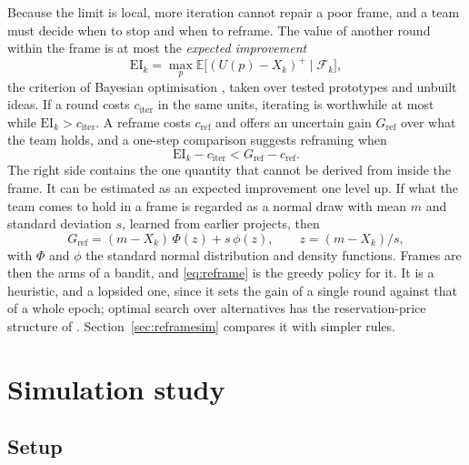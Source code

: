 \documentclass[preprint,review,11pt,authoryear]{elsarticle}
\newcommand{\E}{\mathbb{E}}
\newcommand{\filt}{\mathcal{F}}
\theoremstyle{definition}
\begin{document}
Because the limit is local, more iteration cannot repair a poor frame, and a team must decide when to stop and when to reframe. The value of another round within the frame is at most the \emph{expected improvement}
\begin{equation}
\label{eq:ei}
\mathrm{EI}_k=\max_p\E\big[(U(p)-X_k)^+\mid\filt_k\big],
\end{equation}
the criterion of Bayesian optimisation \citep{jones1998, frazier2008}, taken over tested prototypes and unbuilt ideas. If a round costs $c_{\mathrm{iter}}$ in the same units, iterating is worthwhile at most while $\mathrm{EI}_k>c_{\mathrm{iter}}$. A reframe costs $c_{\mathrm{ref}}$ and offers an uncertain gain $G_{\mathrm{ref}}$ over what the team holds, and a one-step comparison suggests reframing when
\begin{equation}
\label{eq:reframe}
\mathrm{EI}_k-c_{\mathrm{iter}}<G_{\mathrm{ref}}-c_{\mathrm{ref}} .
\end{equation}
The right side contains the one quantity that cannot be derived from inside the frame. It can be estimated as an expected improvement one level up. If what the team comes to hold in a frame is regarded as a normal draw with mean $m$ and standard deviation $s$, learned from earlier projects, then
\begin{equation}
\label{eq:gref}
G_{\mathrm{ref}}=(m-X_k)\,\Phi(z)+s\,\phi(z),\qquad z=(m-X_k)/s,
\end{equation}
with $\Phi$ and $\phi$ the standard normal distribution and density functions. Frames are then the arms of a bandit, and \eqref{eq:reframe} is the greedy policy for it. It is a heuristic, and a lopsided one, since it sets the gain of a single round against that of a whole epoch; optimal search over alternatives has the reservation-price structure of \citet{weitzman1979}. Section~\ref{sec:reframesim} compares it with simpler rules.

\section{Simulation study}
\label{sec:sim}

\subsection{Setup}
\label{sec:setup}
\end{document}
